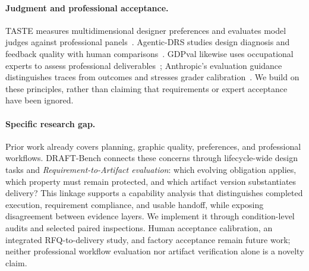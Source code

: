 \paragraph{Judgment and professional acceptance.}
TASTE measures multidimensional designer preferences and evaluates model judges against professional panels~\citep{zhu2026taste}. Agentic-DRS studies design diagnosis and feedback quality with human comparisons~\citep{nag2025agenticdrs}. GDPval likewise uses occupational experts to assess professional deliverables~\citep{patwardhan2026gdpval}; Anthropic's evaluation guidance distinguishes traces from outcomes and stresses grader calibration~\citep{anthropic2026evals}. We build on these principles, rather than claiming that requirements or expert acceptance have been ignored.

\paragraph{Specific research gap.}
Prior work already covers planning, graphic quality, preferences, and professional workflows. DRAFT-Bench connects these concerns through lifecycle-wide design tasks and \emph{Requirement-to-Artifact evaluation}: which evolving obligation applies, which property must remain protected, and which artifact version substantiates delivery? This linkage supports a capability analysis that distinguishes completed execution, requirement compliance, and usable handoff, while exposing disagreement between evidence layers. We implement it through condition-level audits and selected paired inspections. Human acceptance calibration, an integrated RFQ-to-delivery study, and factory acceptance remain future work; neither professional workflow evaluation nor artifact verification alone is a novelty claim.
